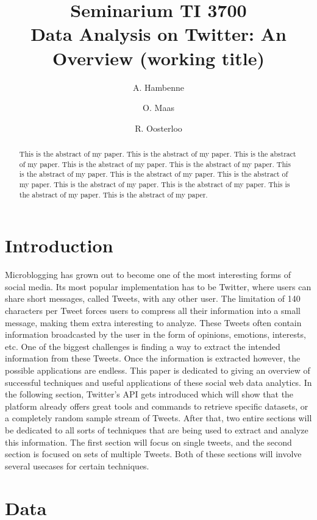 \documentclass{article}
\title{Seminarium TI 3700\\ Data Analysis on Twitter: An Overview (working title)}
\author{A. Hambenne  \and
    O. Maas \and
    R. Oosterloo}
\date{}
\begin{document}
\maketitle
\thispagestyle{empty}

\begin{abstract}
This is the abstract of my paper.
This is the abstract of my paper.
This is the abstract of my paper.
This is the abstract of my paper.
This is the abstract of my paper.
This is the abstract of my paper.
This is the abstract of my paper.
This is the abstract of my paper.
This is the abstract of my paper.
This is the abstract of my paper.
This is the abstract of my paper.
This is the abstract of my paper.
\end{abstract}


\section{Introduction}

Microblogging has grown out to become one of the most interesting forms of social media. Its most popular implementation has to be Twitter, where users can share short messages, called Tweets, with any other user. The limitation of 140 characters per Tweet forces users to compress all their information into a small message, making them extra interesting to analyze. These Tweets often contain information broadcasted by the user in the form of opinions, emotions, interests, etc. One of the biggest challenges is finding a way to extract the intended information from these Tweets. Once the information is extracted however, the possible applications are endless. This paper is dedicated to giving an overview of successful techniques and useful applications of these social web data analytics. In the following section, Twitter's API gets introduced which will show that the platform already offers great tools and commands to retrieve specific datasets, or a completely random sample stream of Tweets. After that, 
two entire sections will be dedicated to all sorts of techniques that are being used to extract and analyze this information. The first section will focus on single tweets, and the second section is focused on sets of multiple Tweets. Both of these sections will involve several usecases for certain techniques.



\section{Data}
\end{document}
